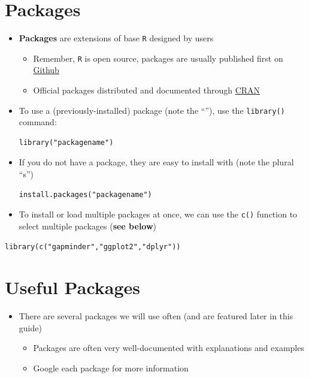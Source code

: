 \documentclass[]{book}
\providecommand{\tightlist}{%
  \setlength{\itemsep}{0pt}\setlength{\parskip}{0pt}}
\theoremstyle{definition}
\theoremstyle{definition}
\theoremstyle{definition}
\theoremstyle{remark}
\begin{document}
\section{Packages}\label{packages}

\begin{itemize}
\item
  \textbf{Packages} are extensions of base \texttt{R} designed by users

  \begin{itemize}
  \tightlist
  \item
    Remember, \texttt{R} is open source, packages are usually published
    first on \href{github.com}{Github}
  \item
    Official packages distributed and documented through
    \href{cran.r-project.org/}{CRAN}
  \end{itemize}
\item
  To use a (previously-installed) package (note the ``''), use the
  \texttt{library()} command:

\begin{verbatim}
library("packagename")
\end{verbatim}
\item
  If you do not have a package, they are easy to install with (note the
  plural ``s'')

\begin{verbatim}
install.packages("packagename")
\end{verbatim}
\item
  To install or load multiple packages at once, we can use the
  \texttt{c()} function to select multiple packages (\textbf{see below})
\end{itemize}

\begin{verbatim}
library(c("gapminder","ggplot2","dplyr"))
\end{verbatim}

\section{Useful Packages}\label{useful-packages}

\begin{itemize}
\tightlist
\item
  There are several packages we will use often (and are featured later
  in this guide)

  \begin{itemize}
  \tightlist
  \item
    Packages are often very well-documented with explanations and
    examples
  \item
    Google each package for more information
  \end{itemize}
\end{itemize}
\end{document}
